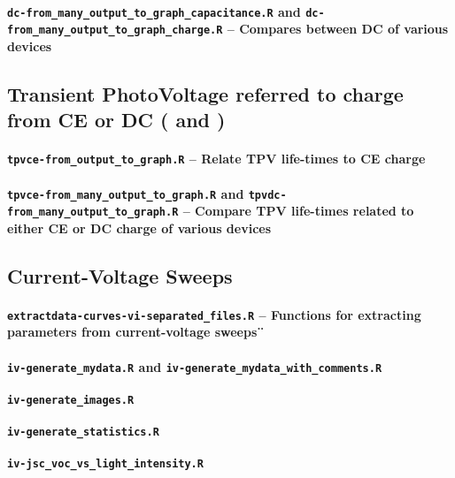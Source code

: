 		\paragraph{\texttt{dc-from_many_output_to_graph_capacitance.R} and \texttt{dc-from_many_output_to_graph_charge.R} -- Compares between DC of various devices}
		

	\subsection{Transient PhotoVoltage referred to charge from CE or DC ( and )}\label{r_tpvcedc}



		\paragraph{\texttt{tpvce-from_output_to_graph.R} -- Relate TPV life\hyp{}times to CE charge}
		
				\paragraph{\texttt{tpvce-from_many_output_to_graph.R} and \texttt{tpvdc-from_many_output_to_graph.R} -- Compare TPV life\hyp{}times related to either CE or DC charge of various devices}

	\subsection{Current-Voltage Sweeps}
		\paragraph{\texttt{extractdata-curves-vi-separated_files.R} -- Functions for extracting parameters from current\hyp{}voltage sweeps¨}
		\paragraph{\texttt{iv-generate_mydata.R} and \texttt{iv-generate_mydata_with_comments.R}}
		\paragraph{\texttt{iv-generate_images.R}}
		\paragraph{\texttt{iv-generate_statistics.R}}
		\paragraph{\texttt{iv-jsc_voc_vs_light_intensity.R}}
